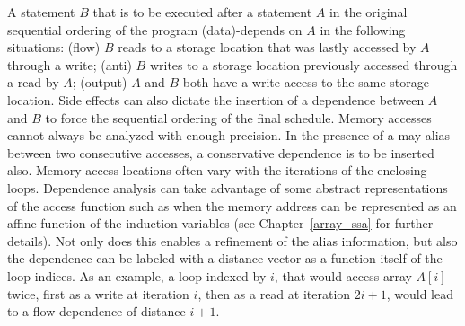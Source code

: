 A statement $B$ that is to be executed after a statement $A$ in the original sequential ordering of the program (data)-depends on $A$ in the following situations: 
(flow) $B$ reads to a storage location that was lastly accessed by $A$ through a write; 
(anti) $B$ writes to a storage location previously accessed through a read by $A$; 
(output) $A$ and $B$ both have a write access to the same storage location. 
Side effects can also dictate the insertion of a dependence between $A$ and $B$ to force the sequential ordering of the final schedule. 
Memory accesses cannot always be analyzed with enough precision. 
In the presence of a may alias between two consecutive accesses, a conservative dependence is to be inserted also. 
Memory access locations often vary with the iterations of the enclosing loops. 
Dependence analysis can take advantage of some abstract representations of the access function such as when the memory address can be represented as an affine function of the induction variables (see Chapter~\ref{array_ssa} for further details). 
Not only does this enables a refinement of the alias information, but also the dependence can be labeled with a distance vector as a function itself of the loop indices. 
As an example, a loop indexed by $i$, that would access array $A[i]$ twice, first as a write at iteration $i$, then as a read at iteration $2i+1$, would lead to a flow dependence of distance $i+1$.

